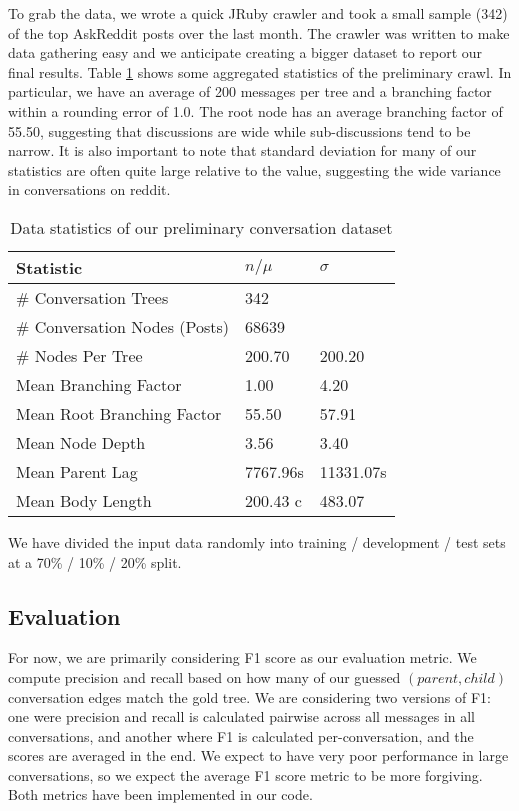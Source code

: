 \documentclass[10pt]{article}
\begin{document}
To grab the data, we wrote a quick JRuby crawler and took a small sample (342) of the top
AskReddit posts over the last month. The crawler was written to make data gathering easy
and we anticipate creating a bigger dataset to report our final results. Table \ref{table:stats}
shows some aggregated statistics of the preliminary crawl. In particular, we have an average
of 200 messages per tree and a branching factor within a rounding error of 1.0. The root
node has an average branching factor of 55.50, suggesting that discussions are wide while
sub-discussions tend to be narrow. It is also important to note that standard
deviation for many of our statistics are often quite large relative to the
value, suggesting the wide variance in conversations on reddit.

\begin{table}[h]\footnotesize
 \begin{tabular}{| l | l | l |} 
   \hline
   \textbf{Statistic} & \textbf{$n / \mu$} & \textbf{$\sigma$} \\
   \hline
    \# Conversation Trees &  342 & \\
    \# Conversation Nodes (Posts) & 68639 & \\
    \# Nodes Per Tree &  200.70 & 200.20 \\
    Mean Branching Factor & 1.00 & 4.20 \\
    Mean Root Branching Factor &  55.50 & 57.91 \\
    Mean Node Depth  & 3.56 & 3.40 \\
    Mean Parent Lag & 7767.96s & 11331.07s \\
    Mean Body Length & 200.43 c & 483.07 \\
   \hline
  \end{tabular}
  \caption{Data statistics of our preliminary conversation dataset}
  \label{table:stats}
\end{table}

We have divided the input data randomly into training / development / test sets
at a 70\% / 10\% / 20\% split.

\subsection{Evaluation}
For now, we are primarily considering F1 score as our evaluation metric. We
compute precision and recall based on how many of our guessed $(parent,child)$
conversation edges match the gold tree. We are considering two
versions of F1: one were precision and recall is calculated pairwise across all
messages in all conversations, and another where F1 is calculated
per-conversation, and the scores are averaged in the end. We expect to have
very poor performance in large conversations, so we expect the average F1 score metric to be
more forgiving. Both metrics have been implemented in our code.
\end{document}
